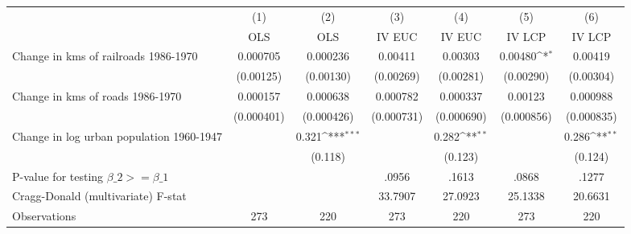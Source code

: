 {
\def\sym#1{\ifmmode^{#1}\else\(^{#1}\)\fi}
\begin{tabular}{l*{6}{c}}
\hline\hline
                &\multicolumn{1}{c}{(1)}&\multicolumn{1}{c}{(2)}&\multicolumn{1}{c}{(3)}&\multicolumn{1}{c}{(4)}&\multicolumn{1}{c}{(5)}&\multicolumn{1}{c}{(6)}\\
                &\multicolumn{1}{c}{OLS}&\multicolumn{1}{c}{OLS}&\multicolumn{1}{c}{IV EUC}&\multicolumn{1}{c}{IV EUC}&\multicolumn{1}{c}{IV LCP}&\multicolumn{1}{c}{IV LCP}\\
\hline
Change in kms of railroads 1986-1970& 0.000705         & 0.000236         &  0.00411         &  0.00303         &  0.00480\sym{*}  &  0.00419         \\
                &(0.00125)         &(0.00130)         &(0.00269)         &(0.00281)         &(0.00290)         &(0.00304)         \\
[1em]
Change in kms of roads 1986-1970& 0.000157         & 0.000638         & 0.000782         & 0.000337         &  0.00123         & 0.000988         \\
                &(0.000401)         &(0.000426)         &(0.000731)         &(0.000690)         &(0.000856)         &(0.000835)         \\
[1em]
Change in log urban population 1960-1947&                  &    0.321\sym{***}&                  &    0.282\sym{**} &                  &    0.286\sym{**} \\
                &                  &  (0.118)         &                  &  (0.123)         &                  &  (0.124)         \\
\hline
P-value for testing $\beta\_{2} >= \beta\_{1}$&                  &                  &    .0956         &    .1613         &    .0868         &    .1277         \\
Cragg-Donald (multivariate) F-stat&                  &                  &  33.7907         &  27.0923         &  25.1338         &  20.6631         \\
Observations    &      273         &      220         &      273         &      220         &      273         &      220         \\
\hline\hline
\end{tabular}
}
